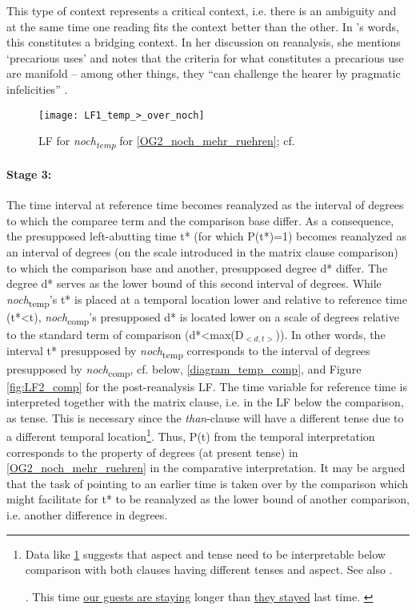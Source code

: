 \documentclass[output=paper,
modfonts
]{langscibook}
\begin{document}
This type of context represents a critical context, i.e. there is an ambiguity and at the same time one reading fits the context better than the other. In \citeauthor{Eckardt_2011}'s \citeyearpar{Eckardt_2011} words, this constitutes a bridging context. In her discussion on reanalysis, she mentions `precarious uses' and notes that the criteria for what constitutes a precarious use are manifold -- among other things, they ``can challenge the hearer by pragmatic infelicities'' \citep[44]{Eckardt_2011}.

\begin{figure}[H]
\texttt{[image: LF1\_temp\_>\_over\_noch]}
\caption{LF for \textit{noch\textsubscript{temp}} for \ref{OG2_noch_mehr_ruehren}; cf. \citep{beck2016a_sub}}
\label{fig:LF1_temp_>_over_noch}
\end{figure}

\paragraph*{Stage 3:} The time interval at reference time becomes reanalyzed as the interval of degrees to which the comparee term and the comparison base differ. As a consequence, the presupposed left-abutting time t* (for which P(t*)=1) becomes reanalyzed as an interval of degrees (on the scale introduced in the matrix clause comparison) to which the comparison base and another, presupposed degree d* differ. The degree d* serves as the lower bound of this second interval of degrees. While \textit{noch}\textsubscript{temp}'s t* is placed at a temporal location lower and relative to reference time (t*<t), \textit{noch}\textsubscript{comp}'s presupposed d* is located lower on a scale of degrees relative to the standard term of comparison (d*<max(D$_{<d,t>}$)). In other words, the interval t* presupposed by \textit{noch}\textsubscript{temp} corresponds to the interval of degrees presupposed by \textit{noch}\textsubscript{comp}, cf. below, \ref{diagram_temp_comp}, and Figure \ref{fig:LF2_comp} for the post-reanalysis LF. The time variable for reference time is interpreted together with the matrix clause, i.e. in the LF below the comparison, as tense. This is necessary since the \textit{than}-clause will have a different tense due to a different temporal location\footnote{ Data like \ref{tense_and_aspect_example} suggests that aspect and tense need to be interpretable below comparison with both clauses having different tenses and aspect. See also \citep{stechow2006}.

\ex. This time \underline{our guests are staying} longer than \underline{they stayed} last time. \label{tense_and_aspect_example}

}. Thus, P(t) from the temporal interpretation corresponds to the property of degrees (at present tense) in \ref{OG2_noch_mehr_ruehren} in the comparative interpretation. 
It may be argued that the task of pointing to an earlier time is taken over by the comparison which might facilitate for t* to be reanalyzed as the lower bound of another comparison, i.e. another difference in degrees. 
\end{document}

